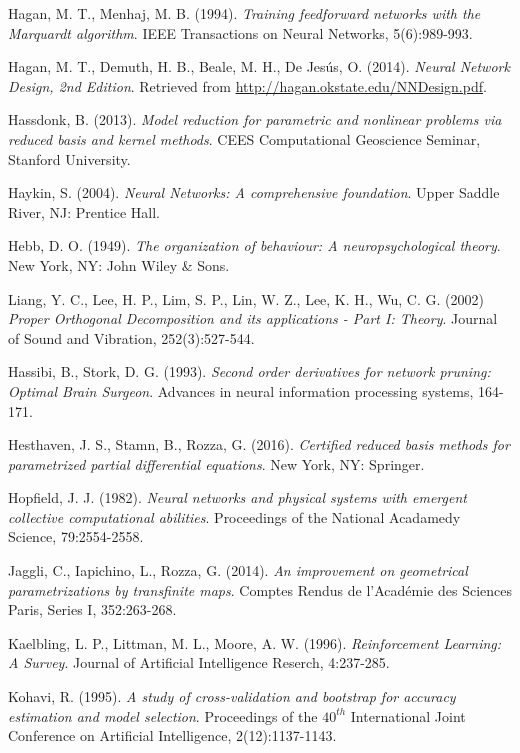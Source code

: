 \documentclass[12pt, a4paper, twoside, openright]{report}
\numberwithin{equation}{chapter}
\theoremstyle{theorem}
\theoremstyle{definition}
\theoremstyle{remark}
\theoremstyle{proposition}
\numberwithin{figure}{chapter}
\begin{document}
\begin{thebibliography}{50}
		Hagan, M. T., Menhaj, M. B. (1994). \emph{Training feedforward networks with the Marquardt algorithm}. IEEE Transactions on Neural Networks, 5(6):989-993.
		
		Hagan, M. T., Demuth, H. B., Beale, M. H., De Jes\'us, O. (2014). \emph{Neural Network Design, 2nd Edition}. Retrieved from \url{http://hagan.okstate.edu/NNDesign.pdf}.
		
		Hassdonk, B. (2013). \emph{Model reduction for parametric and nonlinear problems via reduced basis and kernel methods}. CEES Computational Geoscience Seminar, Stanford University.
		
		Haykin, S. (2004). \emph{Neural Networks: A comprehensive foundation}. Upper Saddle River, NJ: Prentice Hall.
		
		Hebb, D. O. (1949). \emph{The organization of behaviour: A neuropsychological theory}. New York, NY: John Wiley \& Sons. 
		
		Liang, Y. C., Lee, H. P., Lim, S. P., Lin, W. Z., Lee, K. H., Wu, C. G. (2002) \emph{Proper Orthogonal Decomposition and its applications - Part I: Theory}. Journal of Sound and Vibration, 252(3):527-544.
		
		Hassibi, B., Stork, D. G. (1993). \emph{Second order derivatives for network pruning: Optimal Brain Surgeon}. Advances in neural information processing systems, 164-171.
		
		Hesthaven, J. S., Stamn, B., Rozza, G. (2016). \emph{Certified reduced basis methods for parametrized partial differential equations}. New York, NY: Springer.
		
		Hopfield, J. J. (1982). \emph{Neural networks and physical systems with emergent collective computational abilities}. Proceedings of the National Acadamedy Science, 79:2554-2558.
		
		Jaggli, C., Iapichino, L., Rozza, G. (2014). \emph{An improvement on geometrical parametrizations by transfinite maps}. Comptes Rendus de l'Acad\'emie des Sciences Paris, Series I, 352:263-268. 
				
		Kaelbling, L. P., Littman, M. L., Moore, A. W. (1996). \emph{Reinforcement Learning: A Survey}. Journal of Artificial Intelligence Reserch, 4:237-285.
		
		Kohavi, R. (1995). \emph{A study of cross-validation and bootstrap for accuracy estimation and model selection}. Proceedings of the $40^{th}$ International Joint Conference on Artificial Intelligence, 2(12):1137-1143.
		

\end{thebibliography}
\end{document}
